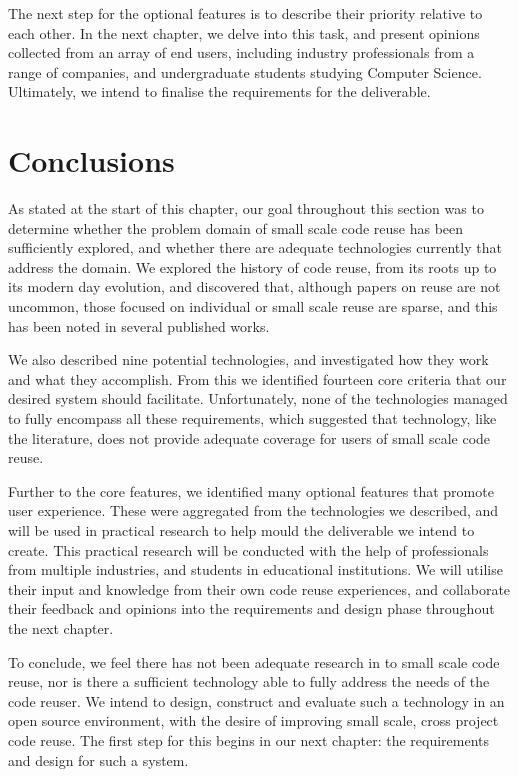 The next step for the optional features is to describe their priority relative to each other.
In the next chapter, we delve into this task, and present opinions collected from an array of end users, including industry professionals from a range of companies, and undergraduate students studying Computer Science.
Ultimately, we intend to finalise the requirements for the deliverable.

\section{Conclusions}
As stated at the start of this chapter, our goal throughout this section was to determine whether the problem domain of small scale code reuse has been sufficiently explored, and whether there are adequate technologies currently that address the domain.
We explored the history of code reuse, from its roots up to its modern day evolution, and discovered that, although papers on reuse are not uncommon, those focused on individual or small scale reuse are sparse, and this has been noted in several published works.

We also described nine potential technologies, and investigated how they work and what they accomplish.
From this we identified fourteen core criteria that our desired system should facilitate.
Unfortunately, none of the technologies managed to fully encompass all these requirements, which suggested that technology, like the literature, does not provide adequate coverage for users of small scale code reuse. 

Further to the core features, we identified many optional features that promote user experience.
These were aggregated from the technologies we described, and will be used in practical research to help mould the deliverable we intend to create.
This practical research will be conducted with the help of professionals from multiple industries, and students in educational institutions.
We will utilise their input and knowledge from their own code reuse experiences, and collaborate their feedback and opinions into the requirements and design phase throughout the next chapter.

To conclude, we feel there has not been adequate research in to small scale code reuse, nor is there a sufficient technology able to fully address the needs of the code reuser.
We intend to design, construct and evaluate such a technology in an open source environment, with the desire of improving small scale, cross project code reuse.
The first step for this begins in our next chapter: the requirements and design for such a system.

